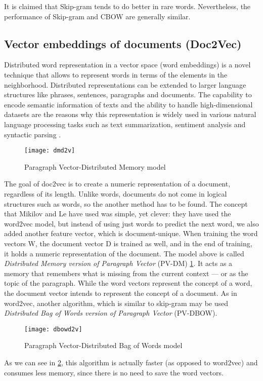 It is claimed that Skip-gram tends to do better in rare words. Nevertheless, the performance of Skip-gram and CBOW are generally similar.

\subsection{Vector embeddings of documents (Doc2Vec)}

Distributed word representation in a vector space (word embeddings) is a novel technique that allows to represent words in terms of the elements in the neighborhood.
Distributed representations can be extended to larger language structures like phrases, sentences, paragraphs and documents. The capability to encode semantic information of texts and the ability to handle high-dimensional datasets are the reasons why this representation is widely used in various natural language processing tasks such as text summarization, sentiment analysis and syntactic parsing \cite{le2014distributed}.

\begin{figure}[ht]
	\centering
	\texttt{[image: dmd2v]}
	\caption[Doc2Vec]{Paragraph Vector-Distributed Memory model}
	\label{fig:pv-dm}
\end{figure}

The goal of doc2vec is to create a numeric representation of a document, regardless of its length.
Unlike words, documents do not come in logical structures such as words, so the another method has to be found.
The concept that Mikilov and Le \cite{le2014distributed} have used was simple, yet clever: they have used the word2vec model, but instead of using just words to predict the next word, we also added another feature vector, which is document-unique.
When training the word vectors W, the document vector D is trained as well, and in the end of training, it holds a numeric representation of the document.
The model above is called \textit{Distributed Memory version of Paragraph Vector} (PV-DM) \ref{fig:pv-dm}. It acts as a memory that remembers what is missing from the current context — or as the topic of the paragraph. While the word vectors represent the concept of a word, the document vector intends to represent the concept of a document.
As in word2vec, another algorithm, which is similar to skip-gram may be used \textit{Distributed Bag of Words version of Paragraph Vector} (PV-DBOW).

\begin{figure}[ht]
	\centering
	\texttt{[image: dbowd2v]}
	\caption[Doc2Vec]{Paragraph Vector-Distributed Bag of Words model}
	\label{fig:pv-dbow}
\end{figure}

As we can see in \ref{fig:pv-dbow}, this algorithm is actually faster (as opposed to word2vec) and consumes less memory, since there is no need to save the word vectors.
